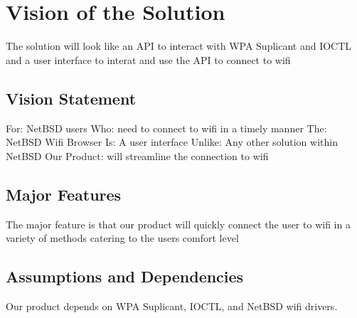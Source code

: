 \section{Vision of the Solution}

The solution will look like an API to interact with WPA Suplicant and IOCTL and a user interface to interat and use the API to connect to wifi

\subsection{Vision Statement}
%

For:         NetBSD users
Who:         need to connect to wifi in a timely manner
The:         NetBSD Wifi Browser
Is:          A user interface
Unlike:      Any other solution within NetBSD
Our Product: will streamline the connection to wifi
  
\subsection{Major Features}

The major feature is that our product will quickly connect the user to wifi in a variety of methods catering to the users comfort level

\subsection{Assumptions and Dependencies}

Our product depends on WPA Suplicant, IOCTL, and NetBSD wifi drivers.
